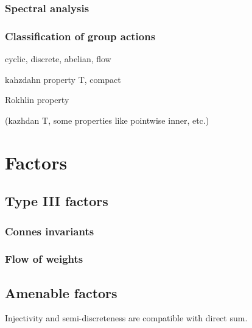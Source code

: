 \documentclass{../../large}
\begin{document}
\section{Spectral analysis}






\section{Classification of group actions}

cyclic, discrete, abelian, flow

kahzdahn property T, compact

Rokhlin property

(kazhdan T, some properties like pointwise inner, etc.)


\chapter{}
\chapter{}




\part{Factors}


\chapter{Type III factors}
\section{Connes invariants}

\section{Flow of weights}



\chapter{Amenable factors}

Injectivity and semi-discreteness are compatible with direct sum.
\end{document}
